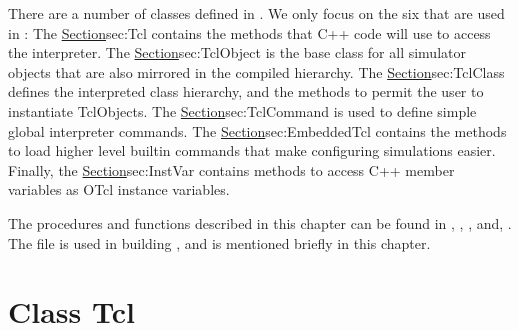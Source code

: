 There are a number of classes defined in \Tclf{}.
We only focus on the six that are used in \ns:
The \href{Class Tcl}{Section}{sec:Tcl} contains the methods that
C++ code will use to access the interpreter.
The \href{class TclObject}{Section}{sec:TclObject}
is the base class for all simulator objects that are also mirrored 
in the compiled hierarchy.
The \href{class TclClass}{Section}{sec:TclClass} defines
the interpreted class hierarchy, and 
the methods to permit the user to instantiate TclObjects.
The \href{class TclCommand}{Section}{sec:TclCommand}
is used to define simple global interpreter commands.
The \href{class EmbeddedTcl}{Section}{sec:EmbeddedTcl}
contains the methods to load higher level builtin commands
that make configuring simulations easier.
Finally, the \href{class InstVar}{Section}{sec:InstVar}
contains methods to access C++ member variables
as OTcl instance variables.

The procedures and functions described in this chapter can be found in
, , , and,
.
The file  is used in building \ns, and is mentioned
briefly in this chapter.

\section{Class Tcl}
\label{sec:Tcl}


